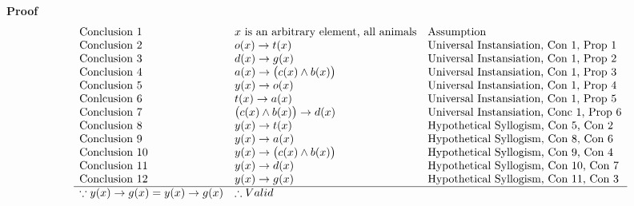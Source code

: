 \documentclass[letterpaper]{article}
\renewcommand\subsection{}
\begin{document}
        \subsection{\bf Proof \sf}
        	\begin{displaymath}
        		\begin{array}{lll}
        			$Conclusion 1$ & x $ is an arbitrary element, all animals$ & $Assumption$\\
                    $Conclusion 2$ & o(x) \rightarrow t(x) & $Universal Instansiation, Con 1, Prop 1$\\
                    $Conclusion 3$ & d(x) \rightarrow g(x) & $Universal Instansiation, Con 1, Prop 2$\\
                    $Conclusion 4$ & a(x) \rightarrow \big (c(x) \wedge b(x) \big ) 
                    	& $Universal Instansiation, Con 1, Prop 3$ \\
                    $Conclusion 5$ & y(x) \rightarrow o(x) & $Universal Instansiation, Con 1, Prop 4$ \\
                    $Conlcusion 6$ & t(x) \rightarrow a(x) & $Universal Instansiation, Con 1, Prop 5$ \\
                    $Conclusion 7$ & \big (c(x) \wedge b(x) \big ) \rightarrow d(x) 
                    	& $Universal Instansiation, Conc 1, Prop 6$ \\
          			$Conclusion 8$ & y(x) \rightarrow t(x) & $Hypothetical Syllogism, Con 5, Con 2$ \\
                    $Conclusion 9$ & y(x) \rightarrow a(x) & $Hypothetical Syllogism, Con 8, Con 6$ \\
                    $Conclusion 10$ & y(x) \rightarrow \big (c(x) \wedge b(x) \big ) & $Hypothetical Syllogism, Con 9, Con 4$ \\
                    $Conclusion 11$ & y(x) \rightarrow d(x) & $Hypothetical Syllogism, Con 10, Con 7$ \\
                    $Conclusion 12$ & y(x) \rightarrow g(x) & $Hypothetical Syllogism, Con 11, Con 3$ \\
                    \hline
                    \because y(x) \rightarrow g(x) = {y(x) \rightarrow g(x)} & \therefore Valid & \\
        		\end{array}
        	\end{displaymath}
	\section{}
\end{document}
